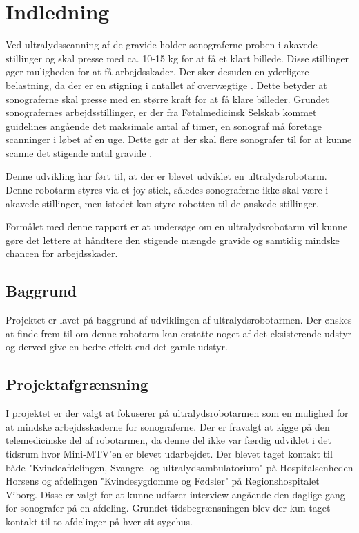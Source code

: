 \chapter{Indledning} 
Ved ultralydsscanning af de gravide holder sonograferne proben i akavede stillinger og skal presse med ca. 10-15 kg for at få et klart billede. Disse stillinger øger muligheden for at få arbejdsskader. Der sker desuden en yderligere belastning, da der er en stigning i antallet af overvægtige \cite{Overvaegt}. Dette betyder at sonograferne skal presse med en større kraft for at få klare billeder. Grundet sonografernes arbejdsstillinger, er der fra Føtalmedicinsk Selskab kommet guidelines angående det maksimale antal af timer, en sonograf må foretage scanninger i løbet af en uge. Dette gør at der skal flere sonografer til for at kunne scanne det stigende antal gravide \cite{Foedsler}.

Denne udvikling har ført til, at der er blevet udviklet en ultralydsrobotarm. Denne robotarm styres via et joy-stick, således sonograferne ikke skal være i akavede stillinger, men istedet kan styre robotten til de ønskede stillinger. 

Formålet med denne rapport er at undersøge om en ultralydsrobotarm vil kunne gøre det lettere at håndtere den stigende mængde gravide og samtidig mindske chancen for arbejdsskader. 

\section{Baggrund}
Projektet er lavet på baggrund af udviklingen af ultralydsrobotarmen. Der ønskes at finde frem til om denne robotarm kan erstatte noget af det eksisterende udstyr og derved give en bedre effekt end det gamle udstyr.

\section{Projektafgrænsning}
 I projektet er der valgt at fokuserer på ultralydsrobotarmen som en mulighed for at mindske arbejdsskaderne for sonograferne. Der er fravalgt at kigge på den telemedicinske del af robotarmen, da denne del ikke var færdig udviklet i det tidsrum hvor Mini-MTV'en er blevet udarbejdet.  
 Der blevet taget kontakt til både "Kvindeafdelingen, Svangre- og ultralydsambulatorium" på Hospitalsenheden Horsens og afdelingen "Kvindesygdomme og Fødsler" på Regionshospitalet Viborg. Disse er valgt for at kunne udfører interview angående den daglige gang for sonografer på en afdeling. Grundet tidsbegrænsningen blev der kun taget kontakt til to afdelinger på hver sit sygehus. 

\label{version_Systemark}

